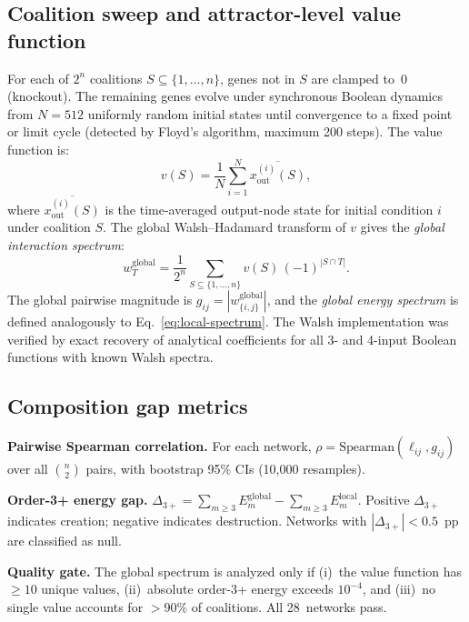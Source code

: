 \documentclass[10pt]{article}
\begin{document}
\subsection{Coalition sweep and attractor-level value function}
\label{sec:coalition-sweep}

For each of $2^n$ coalitions $S \subseteq \{1,\ldots,n\}$, genes not
in $S$ are clamped to~0 (knockout). The remaining genes evolve under
synchronous Boolean dynamics from $N = 512$ uniformly random initial
states until convergence to a fixed point or limit cycle (detected by
Floyd's algorithm, maximum 200 steps). The value function is:
%
\begin{equation}
\label{eq:value}
v(S) = \frac{1}{N} \sum_{i=1}^{N}
\overline{x_{\mathrm{out}}^{(i)}(S)},
\end{equation}
%
where $\overline{x_{\mathrm{out}}^{(i)}(S)}$ is the time-averaged
output-node state for initial condition $i$ under coalition $S$. The
global Walsh--Hadamard transform of $v$ gives the \emph{global
interaction spectrum}:
%
\begin{equation}
\label{eq:global-wht}
w_T^{\mathrm{global}} = \frac{1}{2^n} \sum_{S \subseteq \{1,\ldots,n\}}
v(S)\,(-1)^{|S \cap T|}.
\end{equation}
%
The global pairwise magnitude is
$g_{ij} = |w_{\{i,j\}}^{\mathrm{global}}|$, and the
\emph{global energy spectrum} is defined analogously to
Eq.~\ref{eq:local-spectrum}. The Walsh implementation was verified
by exact recovery of analytical coefficients for all 3- and 4-input
Boolean functions with known Walsh spectra.


\subsection{Composition gap metrics}
\label{sec:metrics}

\textbf{Pairwise Spearman correlation.}
For each network, $\rho = \mathrm{Spearman}(\ell_{ij}, g_{ij})$ over
all $\binom{n}{2}$ pairs, with bootstrap 95\% CIs (10{,}000
resamples).

\textbf{Order-3+ energy gap.}
$\Delta_{3+} = \sum_{m \geq 3} E_m^{\mathrm{global}}
- \sum_{m \geq 3} E_m^{\mathrm{local}}.$
Positive $\Delta_{3+}$ indicates creation; negative indicates
destruction. Networks with $|\Delta_{3+}| < 0.5$~pp are classified as
null.

\textbf{Quality gate.}
The global spectrum is analyzed only if (i)~the value function has
$\geq 10$ unique values, (ii)~absolute order-3+ energy exceeds
$10^{-4}$, and (iii)~no single value accounts for $> 90\%$ of
coalitions. All 28~networks pass.
\end{document}
